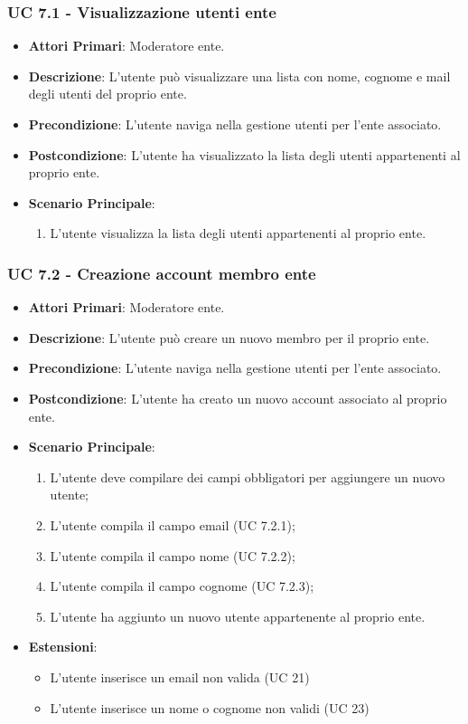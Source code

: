 			\subsubsection{UC 7.1 - Visualizzazione utenti ente}
			\begin{itemize}
				\item \textbf{Attori Primari}: Moderatore ente.
				\item \textbf{Descrizione}: L'utente può visualizzare una lista con nome, cognome e mail degli utenti del proprio ente.
				\item \textbf{Precondizione}: L'utente naviga nella gestione utenti per l'ente associato.
				\item \textbf{Postcondizione}: L'utente ha visualizzato la lista degli utenti appartenenti al proprio ente.
				\item \textbf{Scenario Principale}:
				\begin{enumerate}
					\item{L'utente visualizza la lista degli utenti appartenenti al proprio ente.}
				\end{enumerate}	
			\end{itemize}
			
			\subsubsection{UC 7.2 - Creazione account membro ente}
			\begin{itemize}
				\item \textbf{Attori Primari}: Moderatore ente.
				\item \textbf{Descrizione}: L'utente può creare un nuovo membro per il proprio ente.
				\item \textbf{Precondizione}: L'utente naviga nella gestione utenti per l'ente associato.
				\item \textbf{Postcondizione}: L'utente ha creato un nuovo account associato al proprio ente.
				\item \textbf{Scenario Principale}:
				\begin{enumerate}
					\item{L'utente deve compilare dei campi obbligatori per aggiungere un nuovo utente;}
					\item{L'utente compila il campo email (UC 7.2.1);}
					\item{L'utente compila il campo nome (UC 7.2.2);}
					\item{L'utente compila il campo cognome (UC 7.2.3);}
					\item{L'utente ha aggiunto un nuovo utente appartenente al proprio ente.}
				\end{enumerate}	
				\item \textbf{Estensioni}:
				\begin{itemize}
					\item L'utente inserisce un email non valida (UC 21)
					\item L'utente inserisce un nome o cognome non validi (UC 23)
				\end{itemize}
			\end{itemize}
			
